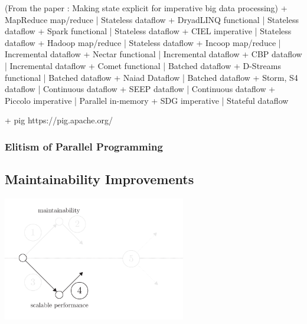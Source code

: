   (From the paper : Making state explicit for imperative big data processing)
  + MapReduce       map/reduce   |   Stateless dataflow
  + DryadLINQ       functional   |   Stateless dataflow
  + Spark           functional   |   Stateless dataflow
  + CIEL            imperative   |   Stateless dataflow
  + Hadoop          map/reduce   |   Stateless dataflow
  + Incoop          map/reduce   |   Incremental dataflow
  + Nectar          functional   |   Incremental dataflow
  + CBP             dataflow     |   Incremental dataflow
  + Comet           functional   |   Batched dataflow
  + D-Streams       functional   |   Batched dataflow
  + Naiad           Dataflow     |   Batched dataflow
  + Storm, S4       dataflow     |   Continuous dataflow
  + SEEP            dataflow     |   Continuous dataflow
  + Piccolo         imperative   |   Parallel in-memory
  + SDG             imperative   |   Stateful dataflow

  + pig https://pig.apache.org/
  






\subsubsection{Elitism of Parallel Programming}



\subsection{Maintainability Improvements}


\begin{center}
\includegraphics[width=0.6\textwidth]{../ressources/state-of-the-art-4.pdf}
\end{center}

